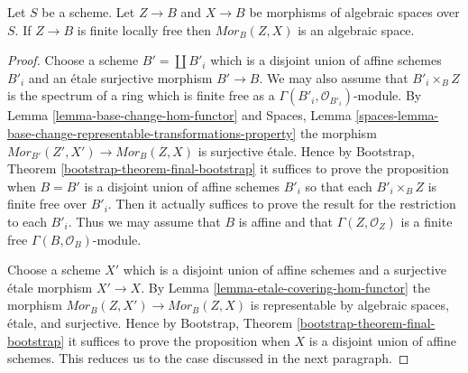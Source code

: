 \begin{proposition}
\label{proposition-hom-functor-algebraic-space}
Let $S$ be a scheme. Let $Z \to B$ and $X \to B$ be morphisms of
algebraic spaces over $S$. If $Z \to B$ is finite locally free
then $\mathit{Mor}_B(Z, X)$ is an algebraic space.
\end{proposition}

\begin{proof}
Choose a scheme $B' = \coprod B'_i$ which is a disjoint union of
affine schemes $B'_i$ and an \'etale surjective morphism $B' \to B$.
We may also assume that $B'_i \times_B Z$ is the spectrum of a ring
which is finite free as a $\Gamma(B'_i, \mathcal{O}_{B'_i})$-module.
By
Lemma \ref{lemma-base-change-hom-functor}
and
Spaces, Lemma
\ref{spaces-lemma-base-change-representable-transformations-property}
the morphism $\mathit{Mor}_{B'}(Z', X') \to \mathit{Mor}_B(Z, X)$
is surjective \'etale. Hence by
Bootstrap, Theorem \ref{bootstrap-theorem-final-bootstrap}
it suffices to prove the proposition when $B = B'$ is a disjoint union of
affine schemes $B'_i$ so that each $B'_i \times_B Z$ is finite free
over $B'_i$. Then it actually suffices to prove the result for the restriction
to each $B'_i$. Thus we may assume that $B$ is affine and that
$\Gamma(Z, \mathcal{O}_Z)$ is a finite free $\Gamma(B, \mathcal{O}_B)$-module.

\medskip\noindent
Choose a scheme $X'$ which is a disjoint union of affine schemes and
a surjective \'etale morphism $X' \to X$. By
Lemma \ref{lemma-etale-covering-hom-functor}
the morphism $\mathit{Mor}_B(Z, X') \to \mathit{Mor}_B(Z, X)$
is representable by algebraic spaces, \'etale, and surjective.
Hence by
Bootstrap, Theorem \ref{bootstrap-theorem-final-bootstrap}
it suffices to prove the proposition when $X$ is a disjoint union
of affine schemes. This reduces us to the case discussed in the next
paragraph.


\end{proof}
